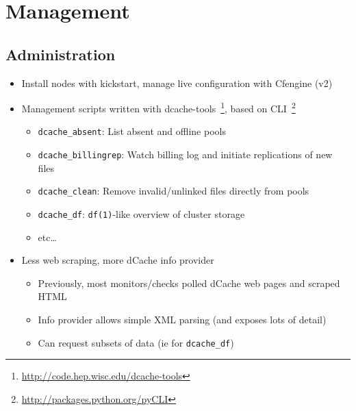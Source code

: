 \documentclass{beamer}
\begin{document}
\section{Management}
\subsection{Administration} %
\begin{frame}
\begin{itemize}
	\item Install nodes with kickstart, manage live configuration with Cfengine (v2)
	\item Management scripts written with dcache-tools~\footnote{\url{http://code.hep.wisc.edu/dcache-tools}}, based on CLI~\footnote{\url{http://packages.python.org/pyCLI}}
	\begin{itemize}
		\item {\tt dcache\_absent}: List absent and offline pools
		\item {\tt dcache\_billingrep}: Watch billing log and initiate replications of new files
		\item {\tt dcache\_clean}: Remove invalid/unlinked files directly from pools
		\item {\tt dcache\_df}: {\tt df(1)}-like overview of cluster storage
		\item etc\ldots{}
	\end{itemize}
	\item Less web scraping, more dCache info provider
	\begin{itemize}
		\item Previously, most monitors/checks polled dCache web pages and scraped HTML
		\item Info provider allows simple XML parsing (and exposes lots of detail)
		\item Can request subsets of data (ie for {\tt dcache\_df})
	\end{itemize}
\end{itemize}
\end{frame}
\end{document}
